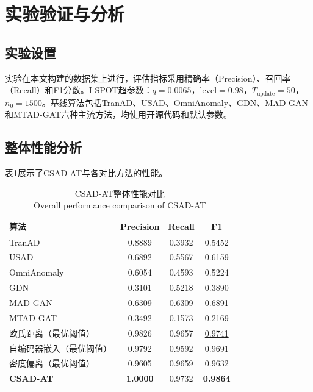 \documentclass[10.5pt,a4paper,twocolumn]{ctexart}
\newcommand{\bicaption}[2]{%
  \caption{#1\\{\small #2}}%
}
\begin{document}
\section{实验验证与分析}

\subsection{实验设置}

实验在本文构建的数据集上进行，评估指标采用精确率（Precision）、召回率（Recall）和F1分数。I-SPOT超参数：$q = 0.0065$，$\text{level} = 0.98$，$T_{\text{update}} = 50$，$n_0 = 1500$。基线算法包括TranAD、USAD、OmniAnomaly、GDN、MAD-GAN和MTAD-GAT六种主流方法，均使用开源代码和默认参数。

\subsection{整体性能分析}

表\ref{tab:overall_results}展示了CSAD-AT与各对比方法的性能。

\begin{table}[htbp]
    \centering
    \bicaption{CSAD-AT整体性能对比}{Overall performance comparison of CSAD-AT}
    \label{tab:overall_results}
    \begin{tabular}{lccc}
        \toprule
        算法 & Precision & Recall & F1 \\
        \midrule
        TranAD\cite{tuli2022tranad}      & 0.8889 & 0.3932 & 0.5452 \\
        USAD\cite{audibert2020usad}       & 0.6892 & 0.5567 & 0.6159 \\
        OmniAnomaly\cite{su2019omni}      & 0.6054 & 0.4593 & 0.5224 \\
        GDN\cite{deng2021graph}           & 0.3101 & 0.5218 & 0.3890 \\
        MAD-GAN\cite{li2019madgan}        & 0.6309 & 0.6309 & 0.6891 \\
        MTAD-GAT\cite{zhao2020mtadgat}    & 0.3492 & 0.1573 & 0.2169 \\
        \midrule
        欧氏距离（最优阈值）     & 0.9826 & 0.9657 & \underline{0.9741} \\
        自编码器嵌入（最优阈值） & 0.9792 & 0.9592 & 0.9691 \\
        密度偏离（最优阈值）     & 0.9605 & 0.9659 & 0.9632 \\
        \midrule
        \textbf{CSAD-AT}        & \textbf{1.0000} & 0.9732 & \textbf{0.9864} \\
        \bottomrule
    \end{tabular}
\end{table}
\end{document}
